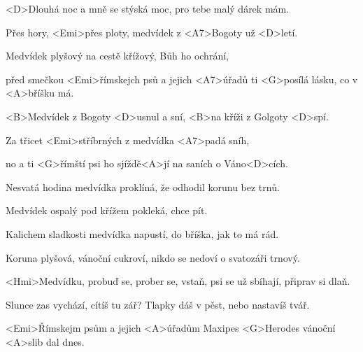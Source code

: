 

\zs
<D>Dlouhá noc a mně se stýská moc,
pro tebe malý dárek mám.

Přes hory, <Emi>přes ploty,
medvídek z <A7>Bogoty už <D>letí.

Medvídek plyšový na cestě
křížový, Bůh ho ochrání,

před smečkou <Emi>římskejch psů
a jejich <A7>úřadů
ti <G>posílá lásku, co v <A>bříšku má.
\ks


\zr
<B>Medvídek z Bogoty <D>usnul a sní,
<B>na kříži z Golgoty <D>spí.

Za třicet <Emi>stříbrných
z medvídka <A7>padá sníh,

no a ti <G>římští psi
ho sjíždě<A>jí na saních o Váno<D>cích.
\kr

\zs
Nesvatá hodina medvídka proklíná,
že odhodil korunu bez trnů.

Medvídek ospalý pod křížem pokleká,
chce pít.

Kalichem sladkosti medvídka
napustí, do bříška, jak to má rád.

Koruna plyšová, vánoční cukroví,
nikdo se nedoví o svatozáři trnový.
\ks

\zr \kr

\zs
<Hmi>Medvídku, probuď se, prober se, vstaň,
psi se už sbíhají, připrav si dlaň.

Slunce zas vychází, cítíš tu zář?
Tlapky dáš v pěst, nebo nastavíš tvář.

<Emi>Římskejm psům a jejich <A>úřadům
Maxipes <G>Herodes vánoční <A>slib dal dnes.
\ks

\zr \kr

\kp
